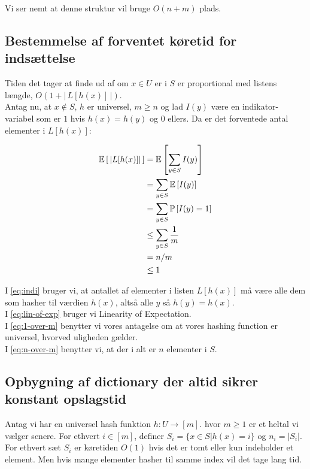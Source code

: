 Vi ser nemt at denne struktur vil bruge $O(n + m)$ plads.

\subsection{Bestemmelse af forventet køretid for indsættelse}

Tiden det tager at finde ud af om $x \in U$ er i $S$ er proportional med listens længde, $O(1 + | \, L[h(x)] \, |)$.\\

Antag nu, at $x \notin S$, $h$ er universel, $m \geq n$ og lad $I(y)$ være en indikator-variabel som er $1$ hvis $h(x) = h(y)$ og $0$ ellers. Da er det forventede antal elementer i $L[h(x)]$:

\begin{align}
  \mathbb{E} \left[   \, |L[h(x)]| \,   \right]
  &= \mathbb{E} \left[   \sum_{y \in S} I(y)  \right] \label{eq:indi} \\
  &= \sum_{y \in S} \mathbb{E} \left[  I(y)  \right] \label{eq:lin-of-exp} \\
  &= \sum_{y \in S} \mathbb{P} \left[  I(y) = 1  \right] \nonumber \\
  &\leq \sum_{y \in S} \frac{1}{m} \label{eq:1-over-m} \\
  &= n/m \label{eq:n-over-m} \\
  &\leq 1 \nonumber
\end{align}

I \cref{eq:indi} bruger vi, at antallet af elementer i listen $L[h(x)]$ må være alle dem som hasher til værdien $h(x)$, altså alle $y$ så $h(y) = h(x)$.\\
I \cref{eq:lin-of-exp} bruger vi Linearity of Expectation.\\
I \cref{eq:1-over-m} benytter vi vores antagelse om at vores hashing function er universel, hvorved uligheden gælder.\\
I \cref{eq:n-over-m} benytter vi, at der i alt er $n$ elementer i $S$.






\subsection{Opbygning af dictionary der altid sikrer konstant opslagstid}
Antag vi har en universel hash funktion $h : U \rightarrow [m]$. hvor $m \geq 1$ er et heltal vi vælger senere. For ethvert $i \in [m]$, definer $S_i = \{ x \in S | h(x) = i \}$ og $n_i = |S_i|$. For ethvert sæt $S_i$ er køretiden $O(1)$ hvis det er tomt eller kun indeholder et element. Men hvis mange elementer hasher til samme index vil det tage lang tid.\\

